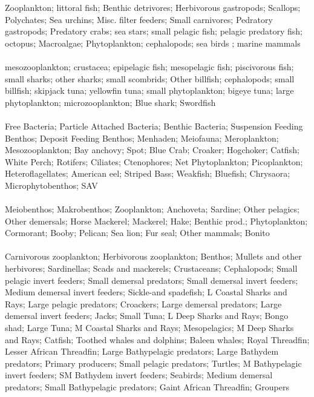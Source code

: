 \hline
Zooplankton; littoral fish; Benthic detrivores; Herbivorous gastropods; Scallops; Polychates; Sea urchins; Misc. filter feeders; Small carnivores; Pedratory gastropods; Predatory crabs; sea stars; small pelagic fish; pelagic predatory fish; octopus; Macroalgae; Phytoplankton; cephalopods; sea birds ; marine mammals\\
\fullhline
\hline
{} \\
\hline
mesozooplankton; crustacea; epipelagic fish; mesopelagic fish; piscivorous fish; small sharks; other sharks; small scombrids; Other billfish; cephalopods; small billfish; skipjack tuna; yellowfin tuna; small phytoplankton; bigeye tuna; large phytoplankton; microzooplankton; Blue shark; Swordfish\\
\fullhline
\hline
{} \\
\hline
Free Bacteria; Particle Attached Bacteria; Benthic Bacteria; Suspension Feeding Benthos; Deposit Feeding Benthos; Menhaden; Meiofauna; Meroplankton; Mesozooplankton; Bay anchovy; Spot; Blue Crab; Croaker; Hogchoker; Catfish; White Perch; Rotifers; Ciliates; Ctenophores; Net Phytoplankton; Picoplankton; Heteroflagellates; American eel; Striped Bass; Weakfish; Bluefish; Chrysaora; Microphytobenthos; SAV\\
\fullhline
\hline
{} \\
\hline
Meiobenthos; Makrobenthos; Zooplankton; Anchoveta; Sardine; Other pelagics; Other demersals; Horse Mackerel; Mackerel; Hake; Benthic prod.; Phytoplankton; Cormorant; Booby; Pelican; Sea lion; Fur seal; Other mammals; Bonito\\
\fullhline
\hline
{} \\
\hline
Carnivorous zooplankton; Herbivorous zooplankton; Benthos; Mullets and other herbivores; Sardinellas; Scads and mackerels; Crustaceans; Cephalopods; Small pelagic invert feeders; Small demersal predators; Small demersal invert feeders; Medium demersal invert feeders; Sickle-and spadefish; L Coastal Sharks and Rays; Large pelagic predators; Croackers; Large demersal predators; Large demersal invert feeders; Jacks; Small Tuna; L Deep Sharks and Rays; Bongo shad; Large Tuna; M Coastal Sharks and Rays; Mesopelagics; M Deep Sharks and Rays; Catfish; Toothed whales and dolphins; Baleen whales; Royal Threadfin; Lesser African Threadfin; Large Bathypelagic predators; Large Bathydem predators; Primary producers; Small pelagic predators; Turtles; M Bathypelagic invert feeders; SM Bathydem invert feeders; Seabirds; Medium demersal predators; Small Bathypelagic predators; Gaint African Threadfin; Groupers\\
